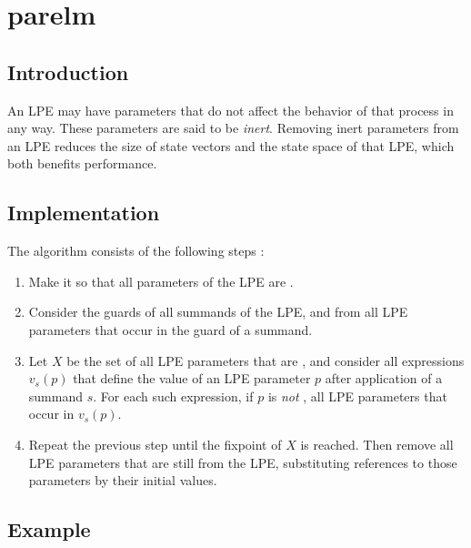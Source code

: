 \chapter{parelm}

\section{Introduction}

An LPE may have parameters that do not affect the behavior of that process in any way.
These parameters are said to be \emph{inert}.
Removing inert parameters from an LPE reduces the size of state vectors and the state space of that LPE, which both benefits performance.

\section{Implementation}

The algorithm consists of the following steps \cite{groote2001computer}:

\begin{enumerate}

\item Make it so that all parameters of the LPE are .

\item Consider the guards of all summands of the LPE, and  from all LPE parameters that occur in the guard of a summand.

\item Let $X$ be the set of all LPE parameters that are , and consider all expressions $v_s(p)$ that define the value of an LPE parameter $p$ after application of a summand $s$.
For each such expression, if $p$ is \emph{not} ,  all LPE parameters that occur in $v_s(p)$.

\item Repeat the previous step until the fixpoint of $X$ is reached.
Then remove all LPE parameters that are still  from the LPE, substituting references to those parameters by their initial values.

\end{enumerate}

\clearpage
\section{Example}

